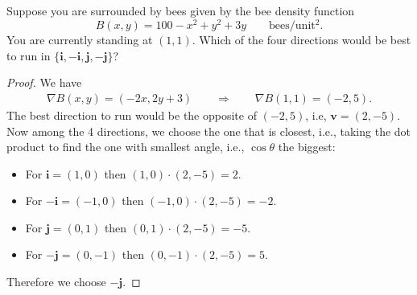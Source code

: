 \begin{example} Suppose you are surrounded by bees given by the bee density function
\begin{equation*}
    B(x,y) = 100-x^2+y^2+3y \qquad \text{bees}/\text{unit}^2.
\end{equation*}
You are currently standing at $(1,1)$. Which of the four directions would be best to run in $\{\textbf{i},-\textbf{i}, \textbf{j}, -\textbf{j}\}$?
\end{example}
\begin{proof} We have
    \begin{align*}
        \nabla B(x,y) = (-2x, 2y+3) \qquad \Longrightarrow\qquad \nabla B(1,1) = (-2, 5).
    \end{align*}
    The best direction to run would be the opposite of $(-2,5)$, i.e, $\textbf{v} = (2,-5)$. Now among the 4 directions, we choose the one that is closest, i.e., taking the dot product to find the one with smallest angle, i.e., $\cos \theta$ the biggest:
    \begin{itemize}
        \item For $\textbf{i} = (1,0)$ then $(1,0)\cdot(2,-5) = 2$.
        \item For $-\textbf{i} = (-1,0)$ then $(-1,0)\cdot(2,-5) = -2$.
        \item For $\textbf{j} = (0,1)$ then $(0,1)\cdot(2,-5) = -5$.
        \item For $-\textbf{j} = (0,-1)$ then $(0,-1)\cdot(2,-5) = 5$.
    \end{itemize}
    Therefore we choose $-\textbf{j}$.
\end{proof}